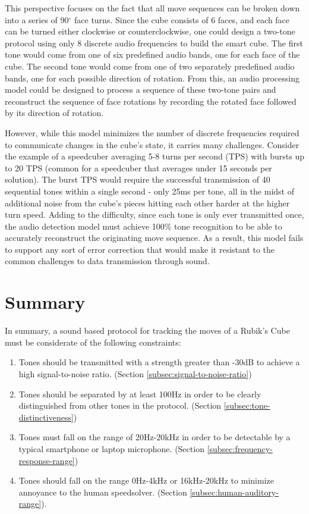 This perspective focuses on the fact that all move sequences can be broken down into a series of 90$^\circ$ face turns.
Since the cube consists of 6 faces, and each face can be turned either clockwise or counterclockwise, one could design a two-tone protocol using only 8 discrete audio frequencies to build the smart cube.
The first tone would come from one of six predefined audio bands, one for each face of the cube. 
The second tone would come from one of two separately predefined audio bands, one for each possible direction of rotation.
From this, an audio processing model could be designed to process a sequence of these two-tone pairs and reconstruct the sequence of face rotations by recording the rotated face followed by its direction of rotation.

However, while this model minimizes the number of discrete frequencies required to communicate changes in the cube's state, it carries many challenges.
Consider the example of a speedcuber averaging 5-8 turns per second (TPS) with bursts up to 20 TPS (common for a speedcuber that averages under 15 seconds per solution).
The burst TPS would require the successful transmission of 40 sequential tones within a single second - only 25ms per tone, all in the midst of additional noise from the cube's pieces hitting each other harder at the higher turn speed.
Adding to the difficulty, since each tone is only ever transmitted once, the audio detection model must achieve 100\% tone recognition to be able to accurately reconstruct the originating move sequence.
As a result, this model fails to support any sort of error correction that would make it resistant to the common challenges to data transmission through sound.

\newpage
\section{Summary}
\label{sec:protocol-summary}
In summary, a sound based protocol for tracking the moves of a Rubik's Cube must be considerate of the following constraints:

\begin{enumerate}
    \item Tones should be transmitted with a strength greater than -30dB to achieve a high signal-to-noise ratio. (Section \ref{subsec:signal-to-noise-ratio})
    \item Tones should be separated by at least 100Hz in order to be clearly distinguished from other tones in the protocol. (Section \ref{subsec:tone-distinctiveness})
    \item Tones must fall on the range of 20Hz-20kHz in order to be detectable by a typical smartphone or laptop microphone. (Section \ref{subsec:frequency-response-range})
    \item Tones should fall on the range 0Hz-4kHz or 16kHz-20kHz to minimize annoyance to the human speedsolver. (Section \ref{subsec:human-auditory-range}).
\end{enumerate}

